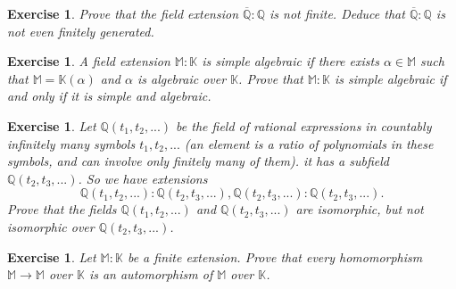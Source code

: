 \documentclass{article}
\newtheorem{exercise}[theorem]{Exercise}
\begin{document}
\begin{exercise}
Prove that the field extension $\overline{\mathbb{Q}}:\mathbb{Q}$ is not finite. Deduce that $\overline{\mathbb{Q}}:\mathbb{Q}$ is not even finitely generated.
\end{exercise}

\begin{exercise}
A field extension $\mathbb{M}:\mathbb{K}$ is simple algebraic if there exists $\alpha\in \mathbb{M}$ such that $\mathbb{M}=\mathbb{K}(\alpha)$ and $\alpha$ is algebraic over $\mathbb{K}$. Prove that $\mathbb{M}:\mathbb{K}$ is simple algebraic if and only if it is simple and algebraic.
\end{exercise}

\begin{exercise}
Let $\mathbb{Q}(t_1,t_2,...)$ be the field of rational expressions in countably infinitely many symbols $t_1,t_2,...$ (an element is a ratio of polynomials in these symbols, and can involve only finitely many of them). it has a subfield $\mathbb{Q}(t_2,t_3,...)$. So we have extensions\[\mathbb{Q}(t_1,t_2,...):\mathbb{Q}(t_2,t_3,...),\mathbb{Q}(t_2,t_3,...):\mathbb{Q}(t_2,t_3,...).\]Prove that the fields $\mathbb{Q}(t_1,t_2,...)$ and $\mathbb{Q}(t_2,t_3,...)$ are isomorphic, but not isomorphic over $\mathbb{Q}(t_2,t_3,...)$.
\end{exercise}

\begin{exercise}
Let $\mathbb{M}:\mathbb{K}$ be a finite extension. Prove that every homomorphism $\mathbb{M}\to\mathbb{M}$ over $\mathbb{K}$ is an automorphism of $\mathbb{M}$ over $\mathbb{K}$.
\end{exercise}
\end{document}
